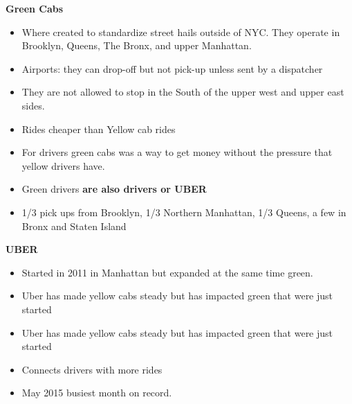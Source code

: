 \textbf{Green Cabs}
\begin{itemize}
\item Where created to standardize street hails outside of NYC. They operate in Brooklyn, Queens, The Bronx, and upper Manhattan. 

\item Airports: they can drop-off but not pick-up unless sent by a dispatcher
\item They are not allowed to stop in the South of the upper west and upper east sides.
\item Rides cheaper than Yellow cab rides
\item For drivers green cabs was a way to get money without the pressure that yellow drivers have.
\item Green drivers  \textbf{are also drivers or UBER}
\item 1/3 pick ups from Brooklyn,  1/3 Northern Manhattan, 1/3 Queens, a few in Bronx and Staten Island \\
\end{itemize}



\textbf{UBER}

\begin{itemize}
\item Started in 2011 in Manhattan but expanded at the same time green.
\item Uber has made yellow cabs steady but has impacted green that were just started 
\item Uber has made yellow cabs steady but has impacted green that were just started 
\item Connects drivers with more rides
\item May 2015 busiest month on record.
\end{itemize}



